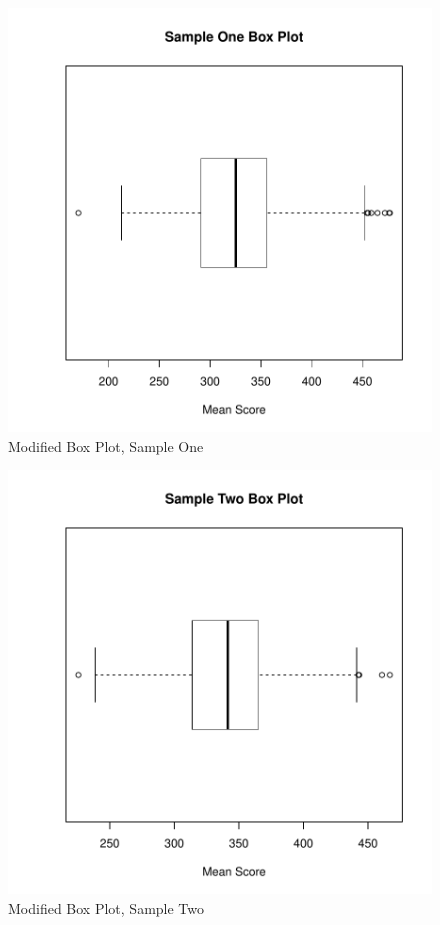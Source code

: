 \documentclass[twocolumn,english]{IEEEtran}
\theoremstyle{plain}
\theoremstyle{plain}
\begin{document}
\begin{figure}[H]
\begin{centering}
\includegraphics{proj3-bxplot1}
\caption{Modified Box Plot, Sample One}
\label{fig:boxplot1}
\end{centering}
\end{figure}

\begin{figure}[H]
\begin{centering}
\includegraphics{proj3-boxplot2}
\caption{Modified Box Plot, Sample Two}
\label{fig:boxplot2}
\end{centering}
\end{figure}
\end{document}
